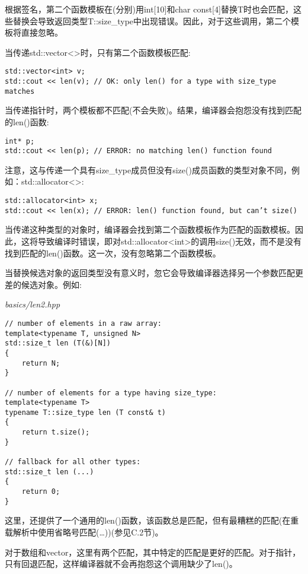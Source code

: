 根据签名，第二个函数模板在(分别)用int[10]和char const[4]替换T时也会匹配，这些替换会导致返回类型T::size\_type中出现错误。因此，对于这些调用，第二个模板将直接忽略。

当传递std::vector<>时，只有第二个函数模板匹配:

\begin{lstlisting}[style=styleCXX]
std::vector<int> v;
std::cout << len(v); // OK: only len() for a type with size_type matches
\end{lstlisting}

当传递指针时，两个模板都不匹配(不会失败)。结果，编译器会抱怨没有找到匹配的len()函数:

\begin{lstlisting}[style=styleCXX]
int* p;
std::cout << len(p); // ERROR: no matching len() function found
\end{lstlisting}

注意，这与传递一个具有size\_type成员但没有size()成员函数的类型对象不同，例如：std::allocator<>:

\begin{lstlisting}[style=styleCXX]
std::allocator<int> x;
std::cout << len(x); // ERROR: len() function found, but can’t size()
\end{lstlisting}

当传递这种类型的对象时，编译器会找到第二个函数模板作为匹配的函数模板。因此，这将导致编译时错误，即对std::allocator<int>的调用size()无效，而不是没有找到匹配的len()函数。这一次，没有忽略第二个函数模板。

当替换候选对象的返回类型没有意义时，忽它会导致编译器选择另一个参数匹配更差的候选对象。例如:

\noindent
\textit{basics/len2.hpp}
\begin{lstlisting}[style=styleCXX]
// number of elements in a raw array:
template<typename T, unsigned N>
std::size_t len (T(&)[N])
{
	return N;
}

// number of elements for a type having size_type:
template<typename T>
typename T::size_type len (T const& t)
{
	return t.size();
}

// fallback for all other types:
std::size_t len (...)
{
	return 0;
}
\end{lstlisting}

这里，还提供了一个通用的len()函数，该函数总是匹配，但有最糟糕的匹配(在重载解析中使用省略号匹配(…))(参见C.2节)。

对于数组和vector，这里有两个匹配，其中特定的匹配是更好的匹配。对于指针，只有回退匹配，这样编译器就不会再抱怨这个调用缺少了len()。

